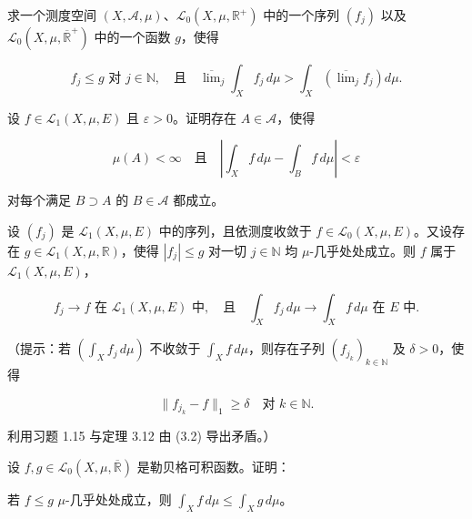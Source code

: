 \exerciseshead

\begin{exercises}
\item

求一个测度空间 $ (X,\mathcal{A},\mu) $、$ \mathcal{L}_0(X,\mu,\mathbb{R}^+) $ 中的一个序列 $ (f_j) $ 以及 $ \mathcal{L}_0(X,\mu,\overline{\mathbb{R}}^+) $ 中的一个函数 $ g $，使得

\[
f_j \le g \text{ 对 } j \in \mathbb{N}, \quad \text{且} \quad \overline{\lim}_j \int_X f_j\,d\mu > \int_X \left(\overline{\lim}_j f_j\right) d\mu .
\]
\item

设 $ f \in \mathcal{L}_1(X,\mu,E) $ 且 $ \varepsilon > 0 $。证明存在 $ A \in \mathcal{A} $，使得

\[
\mu(A) < \infty \quad \text{且} \quad \left| \int_X f\,d\mu - \int_B f\,d\mu \right| < \varepsilon
\]

对每个满足 $ B \supset A $ 的 $ B \in \mathcal{A} $ 都成立。

\item

设 $ (f_j) $ 是 $ \mathcal{L}_1(X,\mu,E) $ 中的序列，且依测度收敛于 $ f \in \mathcal{L}_0(X,\mu,E) $。又设存在 $ g \in \mathcal{L}_1(X,\mu,\mathbb{R}) $，使得 $ |f_j| \le g $ 对一切 $ j \in \mathbb{N} $ 均 $ \mu $-几乎处处成立。则 $ f $ 属于 $ \mathcal{L}_1(X,\mu,E) $，

\[
f_j \to f \text{ 在 } \mathcal{L}_1(X,\mu,E) \text{ 中}, \quad \text{且} \quad \int_X f_j\,d\mu \to \int_X f\,d\mu \text{ 在 } E \text{ 中} .
\]

（提示：若 $ \left(\int_X f_j\,d\mu\right) $ 不收敛于 $ \int_X f\,d\mu $，则存在子列 $ (f_{j_k})_{k \in \mathbb{N}} $ 及 $ \delta > 0 $，使得

\begin{equation}
\|f_{j_k} - f\|_1 \ge \delta \quad \text{对 } k \in \mathbb{N} .\tag{3.2}
\end{equation}

利用习题 1.15 与定理 3.12 由 (3.2) 导出矛盾。）

\item

设 $ f, g \in \mathcal{L}_0(X,\mu,\overline{\mathbb{R}}) $ 是勒贝格可积函数。证明：

\begin{subitems}
\item

若 $ f \le g $ $ \mu $-几乎处处成立，则 $ \int_X f\,d\mu \le \int_X g\,d\mu $。


\end{subitems}
\end{exercises}
